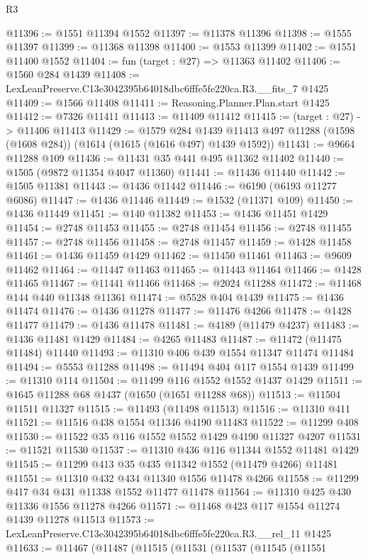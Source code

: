 \begin{lexlean}{R3}
\begin{coremodule}
@11396 := @1551 @11394 @1552
@11397 := @11378 @11396
@11398 := @1555 @11397
@11399 := @11368 @11398
@11400 := @1553 @11399
@11402 := @1551 @11400 @1552
@11404 := fun (target : @27) => @11363 @11402
@11406 := @1560 @284 @1439
@11408 := LexLeanPreserve.C13e3042395b64018dbc6fffe5fe220ca.R3.__fits_7 @1425
@11409 := @1566 @11408
@11411 := Reasoning.Planner.Plan.start @1425
@11412 := @7326 @11411
@11413 := @11409 @11412
@11415 := (target : @27) -> @11406 @11413
@11429 := @1579
    @284
    @1439
    @11413
    @497
    @11288
    (@1598 (@1608 @284))
    (@1614 (@1615 (@1616 @497) @1439 @1592))
@11431 := @9664 @11288 @109
@11436 := @11431 @35 @441 @495 @11362 @11402
@11440 := @1505 (@9872 @11354 @4047 @11360)
@11441 := @11436 @11440
@11442 := @1505 @11381
@11443 := @1436 @11442
@11446 := @6190 (@6193 @11277 @6086)
@11447 := @1436 @11446
@11449 := @1532 (@11371 @109)
@11450 := @1436 @11449
@11451 := @140 @11382
@11453 := @1436 @11451 @1429
@11454 := @2748 @11453
@11455 := @2748 @11454
@11456 := @2748 @11455
@11457 := @2748 @11456
@11458 := @2748 @11457
@11459 := @1428 @11458
@11461 := @1436 @11459 @1429
@11462 := @11450 @11461
@11463 := @9609 @11462
@11464 := @11447 @11463
@11465 := @11443 @11464
@11466 := @1428 @11465
@11467 := @11441 @11466
@11468 := @2024 @11288
@11472 := @11468 @144 @440 @11348 @11361
@11474 := @5528 @404 @1439
@11475 := @1436 @11474
@11476 := @1436 @11278
@11477 := @11476 @4266
@11478 := @1428 @11477
@11479 := @1436 @11478
@11481 := @4189 (@11479 @4237)
@11483 := @1436 @11481 @1429
@11484 := @4265 @11483
@11487 := @11472 (@11475 @11484) @11440
@11493 := @11310 @406 @439 @1554 @11347 @11474 @11484
@11494 := @5553 @11288
@11498 := @11494 @404 @117 @1554 @1439
@11499 := @11310 @114
@11504 := @11499 @116 @1552 @1552 @1437 @1429
@11511 := @1645 @11288 @68 @1437 (@1650 (@1651 @11288 @68))
@11513 := @11504 @11511 @11327
@11515 := @11493 (@11498 @11513)
@11516 := @11310 @411
@11521 := @11516 @438 @1554 @11346 @4190 @11483
@11522 := @11299 @408
@11530 := @11522 @35 @116 @1552 @1552 @1429 @4190 @11327 @4207
@11531 := @11521 @11530
@11537 := @11310 @436 @116 @11344 @1552 @11481 @1429
@11545 := @11299 @413 @35 @435 @11342 @1552 (@11479 @4266) @11481
@11551 := @11310 @432 @434 @11340 @1556 @11478 @4266
@11558 := @11299 @417 @34 @431 @11338 @1552 @11477 @11478
@11564 := @11310 @425 @430 @11336 @1556 @11278 @4266
@11571 := @11468 @423 @117 @1554 @11274 @1439 @11278 @11513
@11573 := LexLeanPreserve.C13e3042395b64018dbc6fffe5fe220ca.R3.__rel_11 @1425
@11633 := @11467
    (@11487
      (@11515
        (@11531
          (@11537
            (@11545
              (@11551

\end{coremodule}
\end{lexlean}
